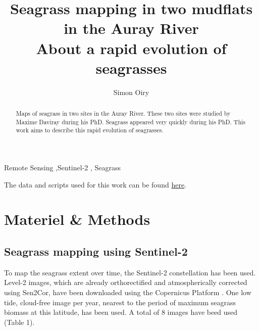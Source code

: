 \documentclass[
  number]{elsarticle}
\begin{document}
\begin{frontmatter}
\title{Seagrass mapping in two mudflats in the Auray
River \\\large{About a rapid evolution of seagrasses} }
\author[1]{Simon Oiry%
%
}



        
\begin{abstract}
Maps of seagrass in two sites in the Auray River. These two sites were
studied by Maxime Daviray during his PhD. Seagrass appeared very quickly
during his PhD. This work aims to describe this rapid evolution of
seagrasses.
\end{abstract}





\begin{keyword}
    Remote Sensing \sep Sentinel-2 \sep 
    Seagrass
\end{keyword}
\end{frontmatter}
    
The data and scripts used for this work can be found
\href{https://github.com/SigOiry/Seagrass_maps_Maxime}{here}.

\section{Materiel \& Methods}\label{materiel-methods}

\subsection{Seagrass mapping using
Sentinel-2}\label{seagrass-mapping-using-sentinel-2}

To map the seagrass extent over time, the Sentinel-2 constellation has
been used. Level-2 images, which are already orthorectified and
atmospherically corrected using Sen2Cor, have been downloaded using the
Copernicus Platform \citep{Copernicus_Sentinel}. One low tide,
cloud-free image per year, nearest to the period of maximum seagrass
biomass at this latitude, has been used. A total of 8 images have beed
used (Table 1).
\end{document}
